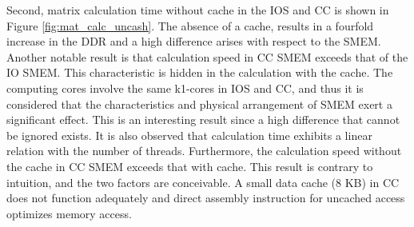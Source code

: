 \documentclass{sig-alternate-05-2015}
\begin{document}
Second, matrix calculation time without cache in the IOS and CC is shown in Figure \ref{fig:mat_calc_uncash}.
The absence of a cache, results in a fourfold increase in the DDR and a high difference arises with respect to the SMEM.
Another notable result is that calculation speed in CC SMEM exceeds that of the IO SMEM.
This characteristic is hidden in the calculation with the cache.
The computing cores involve the same k1-cores in IOS and CC, and thus it is considered that the characteristics and physical arrangement of SMEM exert a significant effect.
This is an interesting result since a high difference that cannot be ignored exists.
It is also observed that calculation time exhibits a linear relation with the number of threads.
Furthermore, the calculation speed without the cache in CC SMEM exceeds that with cache.
This result is contrary to intuition, and the two factors are conceivable.
A small data cache (8 KB) in CC does not function adequately and direct assembly instruction for uncached access optimizes memory access.
\end{document}
